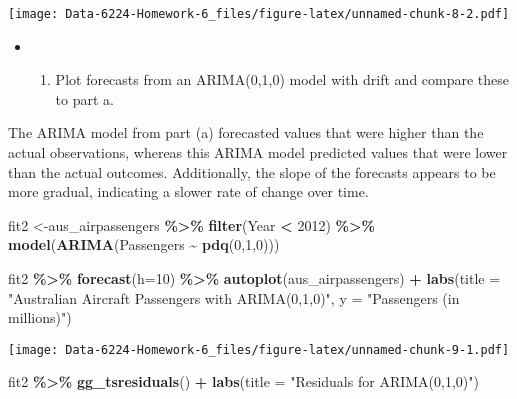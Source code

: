 \documentclass[
]{article}
\newenvironment{Shaded}{\begin{snugshade}}{\end{snugshade}}
\newcommand{\AttributeTok}[1]{\textcolor[rgb]{0.13,0.29,0.53}{#1}}
\newcommand{\DecValTok}[1]{\textcolor[rgb]{0.00,0.00,0.81}{#1}}
\newcommand{\FunctionTok}[1]{\textcolor[rgb]{0.13,0.29,0.53}{\textbf{#1}}}
\newcommand{\NormalTok}[1]{#1}
\newcommand{\OtherTok}[1]{\textcolor[rgb]{0.56,0.35,0.01}{#1}}
\newcommand{\SpecialCharTok}[1]{\textcolor[rgb]{0.81,0.36,0.00}{\textbf{#1}}}
\newcommand{\StringTok}[1]{\textcolor[rgb]{0.31,0.60,0.02}{#1}}
\providecommand{\tightlist}{%
  \setlength{\itemsep}{0pt}\setlength{\parskip}{0pt}}
\begin{document}
\texttt{[image: Data-6224-Homework-6\_files/figure-latex/unnamed-chunk-8-2.pdf]}

\begin{itemize}
\item
  \begin{enumerate}
  \def\labelenumi{\alph{enumi}.}
  \setcounter{enumi}{2}
  \tightlist
  \item
    Plot forecasts from an ARIMA(0,1,0) model with drift and compare
    these to part a.
  \end{enumerate}
\end{itemize}

The ARIMA model from part (a) forecasted values that were higher than
the actual observations, whereas this ARIMA model predicted values that
were lower than the actual outcomes. Additionally, the slope of the
forecasts appears to be more gradual, indicating a slower rate of change
over time.

\begin{Shaded}
\begin{Highlighting}[]
\NormalTok{fit2 }\OtherTok{\textless{}{-}}\NormalTok{aus\_airpassengers }\SpecialCharTok{\%\textgreater{}\%}
  \FunctionTok{filter}\NormalTok{(Year }\SpecialCharTok{\textless{}} \DecValTok{2012}\NormalTok{) }\SpecialCharTok{\%\textgreater{}\%}
  \FunctionTok{model}\NormalTok{(}\FunctionTok{ARIMA}\NormalTok{(Passengers }\SpecialCharTok{\textasciitilde{}} \FunctionTok{pdq}\NormalTok{(}\DecValTok{0}\NormalTok{,}\DecValTok{1}\NormalTok{,}\DecValTok{0}\NormalTok{)))}

\NormalTok{fit2 }\SpecialCharTok{\%\textgreater{}\%} 
  \FunctionTok{forecast}\NormalTok{(}\AttributeTok{h=}\DecValTok{10}\NormalTok{) }\SpecialCharTok{\%\textgreater{}\%}
  \FunctionTok{autoplot}\NormalTok{(aus\_airpassengers) }\SpecialCharTok{+}
  \FunctionTok{labs}\NormalTok{(}\AttributeTok{title =} \StringTok{"Australian Aircraft Passengers with ARIMA(0,1,0)"}\NormalTok{, }\AttributeTok{y =} \StringTok{"Passengers (in millions)"}\NormalTok{)}
\end{Highlighting}
\end{Shaded}

\texttt{[image: Data-6224-Homework-6\_files/figure-latex/unnamed-chunk-9-1.pdf]}

\begin{Shaded}
\begin{Highlighting}[]
\NormalTok{fit2 }\SpecialCharTok{\%\textgreater{}\%} 
  \FunctionTok{gg\_tsresiduals}\NormalTok{() }\SpecialCharTok{+}
  \FunctionTok{labs}\NormalTok{(}\AttributeTok{title =} \StringTok{"Residuals for ARIMA(0,1,0)"}\NormalTok{)}
\end{Highlighting}
\end{Shaded}
\end{document}
